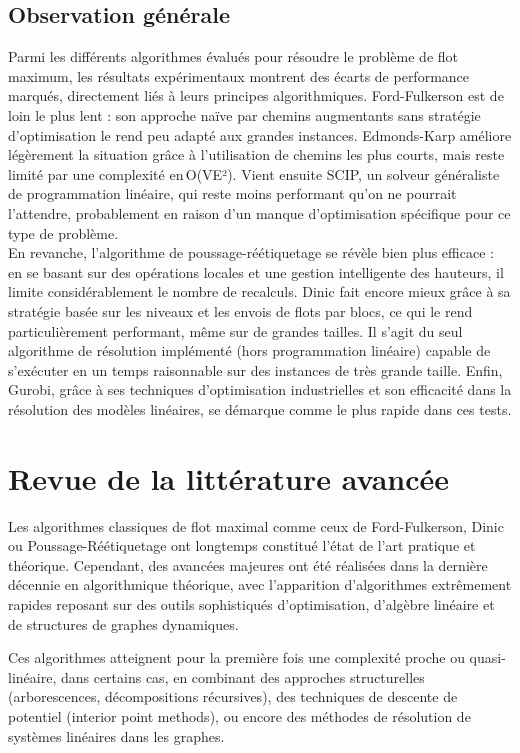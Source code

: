 \documentclass[a4paper]{article}
\begin{document}
\subsection{Observation générale}

Parmi les différents algorithmes évalués pour résoudre le problème de flot maximum, les résultats expérimentaux montrent des écarts de performance marqués, directement liés à leurs principes algorithmiques. Ford-Fulkerson est de loin le plus lent : son approche naïve par chemins augmentants sans stratégie d’optimisation le rend peu adapté aux grandes instances. Edmonds-Karp améliore légèrement la situation grâce à l’utilisation de chemins les plus courts, mais reste limité par une complexité en O(VE²). Vient ensuite SCIP, un solveur généraliste de programmation linéaire, qui reste moins performant qu’on ne pourrait l’attendre, probablement en raison d’un manque d’optimisation spécifique pour ce type de problème.\\

En revanche, l’algorithme de poussage-réétiquetage se révèle bien plus efficace : en se basant sur des opérations locales et une gestion intelligente des hauteurs, il limite considérablement le nombre de recalculs. Dinic fait encore mieux grâce à sa stratégie basée sur les niveaux et les envois de flots par blocs, ce qui le rend particulièrement performant, même sur de grandes tailles. Il s'agit du seul algorithme de résolution implémenté (hors programmation linéaire) capable de s'exécuter en un temps raisonnable sur des instances de très grande taille. Enfin, Gurobi, grâce à ses techniques d’optimisation industrielles et son efficacité dans la résolution des modèles linéaires, se démarque comme le plus rapide dans ces tests.




\section{Revue de la littérature avancée}
Les algorithmes classiques de flot maximal comme ceux de Ford-Fulkerson, Dinic ou Poussage-Réétiquetage ont longtemps constitué l’état de l’art pratique et théorique. Cependant, des avancées majeures ont été réalisées dans la dernière décennie en algorithmique théorique, avec l’apparition d’algorithmes extrêmement rapides reposant sur des outils sophistiqués d’optimisation, d’algèbre linéaire et de structures de graphes dynamiques.

Ces algorithmes atteignent pour la première fois une complexité proche ou quasi-linéaire, dans certains cas, en combinant des approches structurelles (arborescences, décompositions récursives), des techniques de descente de potentiel (interior point methods), ou encore des méthodes de résolution de systèmes linéaires dans les graphes.
\end{document}
